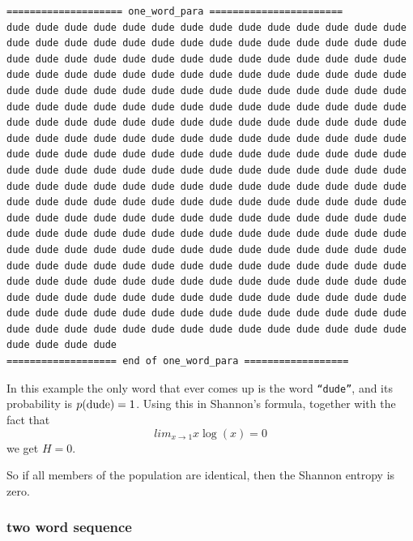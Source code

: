 \documentclass[11pt]{article}
\begin{document}
\begin{tiny}
\begin{verbatim}
==================== one_word_para =======================
dude dude dude dude dude dude dude dude dude dude dude dude dude dude
dude dude dude dude dude dude dude dude dude dude dude dude dude dude
dude dude dude dude dude dude dude dude dude dude dude dude dude dude
dude dude dude dude dude dude dude dude dude dude dude dude dude dude
dude dude dude dude dude dude dude dude dude dude dude dude dude dude
dude dude dude dude dude dude dude dude dude dude dude dude dude dude
dude dude dude dude dude dude dude dude dude dude dude dude dude dude
dude dude dude dude dude dude dude dude dude dude dude dude dude dude
dude dude dude dude dude dude dude dude dude dude dude dude dude dude
dude dude dude dude dude dude dude dude dude dude dude dude dude dude
dude dude dude dude dude dude dude dude dude dude dude dude dude dude
dude dude dude dude dude dude dude dude dude dude dude dude dude dude
dude dude dude dude dude dude dude dude dude dude dude dude dude dude
dude dude dude dude dude dude dude dude dude dude dude dude dude dude
dude dude dude dude dude dude dude dude dude dude dude dude dude dude
dude dude dude dude dude dude dude dude dude dude dude dude dude dude
dude dude dude dude dude dude dude dude dude dude dude dude dude dude
dude dude dude dude dude dude dude dude dude dude dude dude dude dude
dude dude dude dude dude dude dude dude dude dude dude dude dude dude
dude dude dude dude dude dude dude dude dude dude dude dude dude dude
dude dude dude dude
=================== end of one_word_para ==================
\end{verbatim}
\end{tiny}

In this example the only word that ever comes up is the word
\texttt{``dude''}, and its probability is $p({\rm dude}) = 1$.  Using
this in Shannon's formula, together with the fact that
$$lim_{x\rightarrow 1}x \log(x) = 0$$
we get $H = 0$.

So if all members of the population are identical, then the Shannon
entropy is zero.


\subsubsection{two word sequence}
\end{document}
